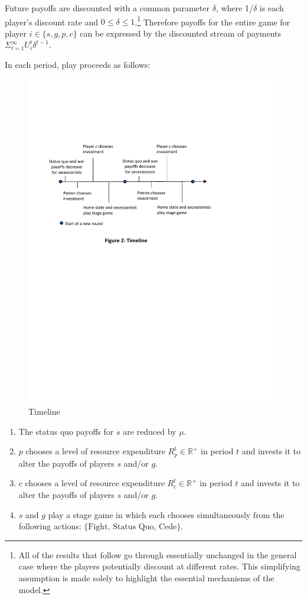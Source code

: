 \documentclass[11pt,letterpaper, notitlepage]{article}
\newcommand{\de}{\delta}
\begin{document}
Future payoffs are discounted with a common parameter $\de$, where 1/$\de$ is each player's discount rate and $0\leq\de\leq1$.\footnote{All of the results that follow go through essentially unchanged in the general case where the players potentially discount at different rates. This simplifying assumption is made solely to highlight the essential mechanisms of the model.} Therefore payoffs for the entire game for player $i\in \{s, g, p, c\} $ can be expressed by the discounted stream of payments $\Sigma_{t=1}^{\infty} U_i^t \de^{t-1}$.

In each period, play proceeds as follows:

\begin{figure}
\includegraphics{Timeline2.pdf}
\caption{Timeline}
\end{figure}

\begin{enumerate} 
\item The status quo payoffs for $s$ are reduced by $\mu$.

\item $p$ chooses a level of resource expenditure $R_p^t\in \mathbb{R}^+$ in period $t$ and invests it to alter the payoffs of players $s$ and/or $g$. 
 
\item $c$ chooses a level of resource expenditure $R_c^t\in \mathbb{R}^+$ in period $t$ and invests it to alter the payoffs of players $s$ and/or $g$. 
 
\item $s$ and $g$ play a stage game in which each chooses simultaneously from the following actions: $\{\text{Fight, Status Quo, Cede}\}$. 
\end{enumerate}
\end{document}
